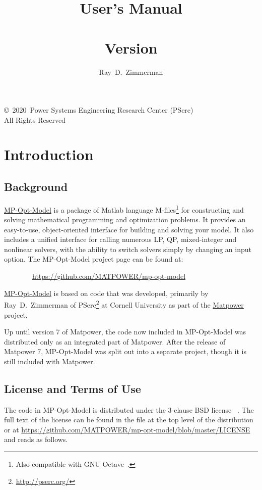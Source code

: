\documentclass[12pt]{article}
\title{{\huge \bfseries \mpomname{} User's Manual } \\ ~ \\ \LARGE Version \mpomver{}}
\author{Ray~D.~Zimmerman}
\newcommand{\matlab}[0]{{\sc Matlab}}
\newcommand{\matpower}[0]{{\sc Matpower}}
\newcommand{\matpowerurl}[0]{https://matpower.org}
\newcommand{\matpowerlink}[0]{\href{\matpowerurl}{\matpower{}}}
\newcommand{\mpom}[0]{\mbox{MP-Opt-Model}}
\newcommand{\mpomurl}[0]{https://github.com/MATPOWER/mp-opt-model}
\newcommand{\mpomlink}[0]{\href{\mpomurl}{\mpom{}}}
\newcommand{\pserc}[0]{{\sc PSerc}}
\newcommand{\PSERC}[0]{{Power Systems Engineering Research Center (\pserc{})}}
\newcommand{\code}[1]{{\relsize{-0.5}{\tt{{#1}}}}}  %
\numberwithin{equation}{section}
\numberwithin{table}{section}
\numberwithin{figure}{section}
\begin{document}
\maketitle
\thispagestyle{empty}
\vfill
\begin{center}
{\scriptsize
\copyright~2020~\PSERC{}\\
All Rights Reserved}
\end{center}

\clearpage
\tableofcontents
\clearpage
\listoftables

\clearpage
\section{Introduction}

\subsection{Background}

\mpomlink{} is a package of \matlab{} language M-files\footnote{Also compatible with GNU Octave~\cite{octave}.} for constructing and solving mathematical programming and optimization problems. It provides an easy-to-use, object-oriented interface for building and solving your model. It also includes a unified interface for calling numerous LP, QP, mixed-integer and nonlinear solvers, with the ability to switch solvers simply by changing an input option.
The \mpom{} project page can be found at:

\bigskip

~~~~~~~~\url{\mpomurl}

\bigskip

\mpomlink{} is based on code that was developed, primarily by Ray~D.~Zimmerman of \pserc{}\footnote{\url{http://pserc.org/}} at Cornell University as part of the \matpowerlink{}~\cite{zimmerman2011,matpower} project.

Up until version 7 of \matpower{}, the code now included in \mpom{} was distributed only as an integrated part of \matpower{}. After the release of \matpower{} 7, \mpom{} was split out into a separate project, though it is still included with \matpower{}.

\clearpage
\subsection{License and Terms of Use}

The code in \mpom{} is distributed under the 3-clause BSD license
~\cite{bsd}. The full text of the license can be found in the \code{LICENSE} file at the top level of the distribution or at \url{https://github.com/MATPOWER/mp-opt-model/blob/master/LICENSE} and reads as follows.
\end{document}
